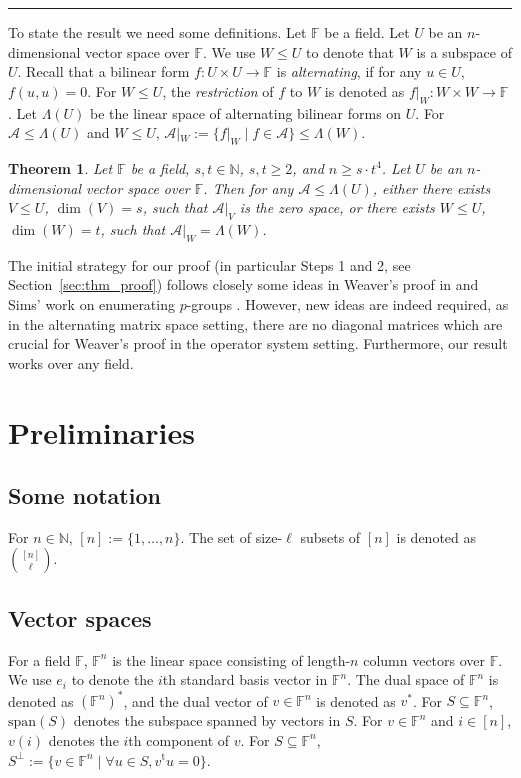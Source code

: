 \documentclass[10pt]{article}
\newtheorem{theorem}{Theorem}[section]
\newcommand{\spa}[1]{\mathcal{#1}}
\newcommand{\F}{\mathbb{F}}
\newcommand{\N}{\mathbb{N}}
\renewcommand{\span}{\mathrm{span}}
\newcommand{\cA}{\spa{A}}
\newcommand{\tr}[1]{#1^{\mathrm{t}}}
\begin{document}
\medskip\hrule\medskip
\setcounter{section}{1}\setcounter{theorem}{0}
To state the result we need some definitions. Let $\F$ be a field. 
Let $U$ be an $n$-dimensional vector space over $\F$. We use $W\leq U$ to 
denote that $W$ is a subspace of $U$. Recall that a bilinear form $f:U\times U\to 
\F$ is \emph{alternating}, if for any $u\in U$, $f(u, u)=0$. For $W\leq U$, the 
\emph{restriction} of $f$ to $W$ is denoted as $f|_W:W\times W\to \F$. 
Let $\Lambda(U)$ be the linear space of alternating bilinear forms on $U$. For 
$\cA\leq \Lambda(U)$ and $W\leq U$, $\cA|_W:=\{f|_W\mid f\in \cA\}\leq\Lambda(W)$. 

\begin{theorem}\label{thm:main}
Let $\F$ be a field, $s, t\in \N$, $s, t\geq 2$, and $n\geq s\cdot t^4$. Let $U$ 
be an $n$-dimensional vector space over $\F$. Then for any 
$\cA\leq\Lambda(U)$, either there exists $V\leq U$, $\dim(V)=s$, such that 
$\cA|_V$ is the zero space, or there exists $W\leq U$, $\dim(W)=t$, such that 
$\cA|_W=\Lambda(W)$. 
\end{theorem}
The initial strategy for our proof (in particular Steps 1 and 2, see 
Section~\ref{sec:thm_proof}) follows closely some ideas in 
Weaver's proof in \cite{Wea17} and Sims' work on enumerating $p$-groups 
\cite[Sec. 2]{Sims65}. However, new ideas are indeed required, as in the 
alternating matrix space setting, there are no diagonal matrices which are crucial 
for Weaver's proof in the operator system setting. 
Furthermore, our result works 
over any field.
\section{Preliminaries}\label{sec:prel} 

\subsection{Some notation} For $n\in\N$, 
$[n]:=\{1, \dots, n\}$. The set of size-$\ell$ subsets of $[n]$ is denoted as 
$\binom{[n]}{\ell}$. 
%
%
%


\subsection{Vector spaces} For a field $\F$, $\F^n$ is the linear space 
consisting of length-$n$ 
column vectors over $\F$. We use $e_i$ to denote the $i$th standard basis vector 
in $\F^n$. 
The dual space of $\F^n$ is denoted as $(\F^n)^*$, and the dual vector 
of $v\in \F^n$ is denoted as $v^*$. 
For $S\subseteq\F^n$, $\span(S)$ 
denotes the subspace spanned by vectors in $S$. For $v\in \F^n$ and $i\in[n]$, 
$v(i)$ denotes the $i$th component of $v$. 
For $S\subseteq\F^n$, 
$S^\perp:=\{v\in \F^n \mid \forall u\in S, \tr{v}u=0\}$.
\end{document}
